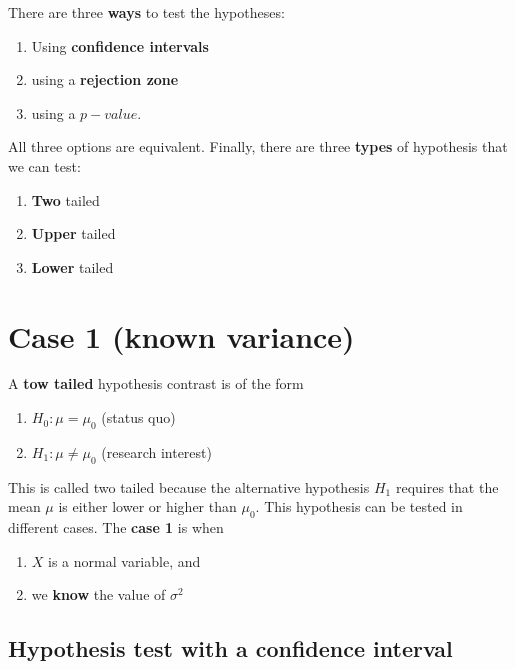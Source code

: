 \documentclass[
]{book}
\providecommand{\tightlist}{%
  \setlength{\itemsep}{0pt}\setlength{\parskip}{0pt}}
\begin{document}
There are three \textbf{ways} to test the hypotheses:

\begin{enumerate}
\def\labelenumi{\arabic{enumi}.}
\tightlist
\item
  Using \textbf{confidence intervals}
\item
  using a \textbf{rejection zone}
\item
  using a \(p-value\).
\end{enumerate}

All three options are equivalent. Finally, there are three \textbf{types} of hypothesis that we can test:

\begin{enumerate}
\def\labelenumi{\arabic{enumi}.}
\tightlist
\item
  \textbf{Two} tailed
\item
  \textbf{Upper} tailed
\item
  \textbf{Lower} tailed
\end{enumerate}

\hypertarget{case-1-known-variance-1}{%
\section{Case 1 (known variance)}\label{case-1-known-variance-1}}

A \textbf{tow tailed} hypothesis contrast is of the form

\begin{enumerate}
\def\labelenumi{\alph{enumi}.}
\tightlist
\item
  \(H_0:\mu = \mu_0\) (status quo)
\item
  \(H_1:\mu \neq \mu_0\) (research interest)
\end{enumerate}

This is called two tailed because the alternative hypothesis \(H_1\) requires that the mean \(\mu\) is either lower or higher than \(\mu_0\). This hypothesis can be tested in different cases. The \textbf{case 1} is when

\begin{enumerate}
\def\labelenumi{\arabic{enumi}.}
\tightlist
\item
  \(X\) is a normal variable, and
\item
  we \textbf{know} the value of \(\sigma^2\)
\end{enumerate}

\hypertarget{hypothesis-test-with-a-confidence-interval}{%
\subsection{Hypothesis test with a confidence interval}\label{hypothesis-test-with-a-confidence-interval}}
\end{document}
